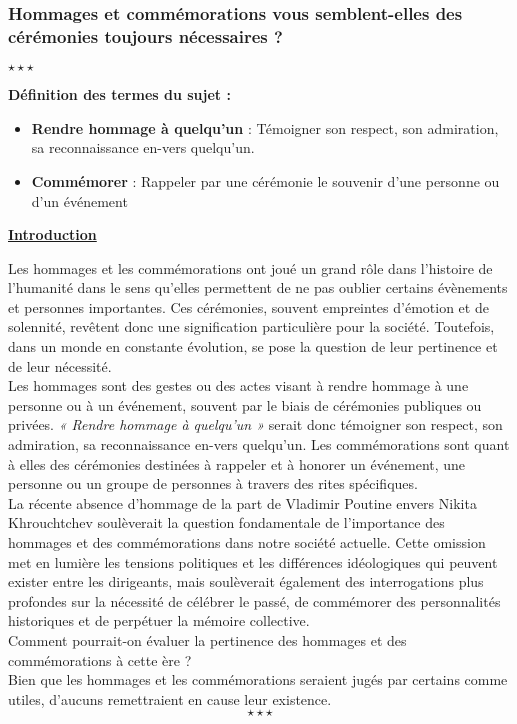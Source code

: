 \begin{center}
	\subsubsection*{{Hommages et commémorations vous semblent-elles des cérémonies toujours nécessaires ?}}
	$\star \star \star$
\end{center}

\noindent \textbf{Définition des termes du sujet :}

\begin{itemize}
	\item \textbf{Rendre hommage à quelqu’un} : Témoigner son respect, son admiration, sa reconnaissance en-vers quelqu’un.
	\item \textbf{Commémorer} : Rappeler par une cérémonie le souvenir d’une personne ou d’un événement
\end{itemize}

\begin{center}
	\textbf{\underline{Introduction}} 
\end{center}


\hspace*{0.5cm}Les hommages et les commémorations ont joué un grand rôle dans l’histoire de l'humanité dans le sens qu’elles permettent de ne pas oublier certains évènements et personnes importantes. Ces cérémonies, souvent empreintes d'émotion et de solennité, revêtent donc une signification particulière pour la société. Toutefois, dans un monde en constante évolution, se pose la question de leur pertinence et de leur nécessité.\\
\hspace*{0.5cm}Les hommages sont des gestes ou des actes visant à rendre hommage à une personne ou à un événement, souvent par le biais de cérémonies publiques ou privées. \textit{« Rendre hommage à quelqu’un »} serait donc témoigner son respect, son admiration, sa reconnaissance en-vers quelqu’un. Les commémorations sont quant à elles des cérémonies destinées à rappeler et à honorer un événement, une personne ou un groupe de personnes à travers des rites spécifiques.\\
\hspace*{0.5cm}La récente absence d’hommage de la part de Vladimir Poutine envers Nikita Khrouchtchev soulèverait la question fondamentale de l’importance des hommages et des commémorations dans notre société actuelle. Cette omission met en lumière les tensions politiques et les différences idéologiques qui peuvent exister entre les dirigeants, mais soulèverait également des interrogations plus profondes sur la nécessité de célébrer le passé, de commémorer des personnalités historiques et de perpétuer la mémoire collective.\\
\hspace*{0.5cm}Comment pourrait-on évaluer la pertinence des hommages et des commémorations à cette ère ?\\
\hspace*{0.5cm}Bien que les hommages et les commémorations seraient jugés par certains comme utiles, d'aucuns remettraient en cause leur existence. $$\star \star \star$$

